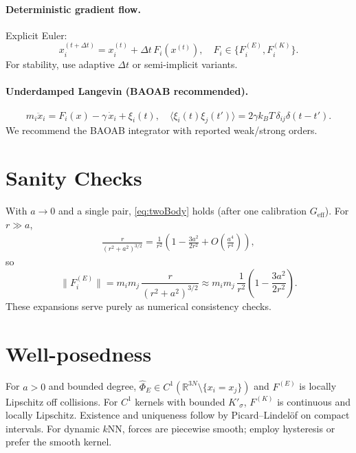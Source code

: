 \documentclass[11pt,a4paper]{article}
\numberwithin{equation}{section}
\newcommand{\R}{\mathbb{R}}
\begin{document}
\paragraph{Deterministic gradient flow.}
Explicit Euler:
\begin{equation}
x_i^{(t+\Delta t)} = x_i^{(t)} + \Delta t\,F_i(x^{(t)}),\quad F_i\in\{F^{(E)}_i,F^{(K)}_i\}.
\end{equation}
For stability, use adaptive $\Delta t$ or semi-implicit variants.

\paragraph{Underdamped Langevin (BAOAB recommended).}
\begin{equation}
m_i\ddot{x}_i = F_i(x)-\gamma\,\dot{x}_i + \xi_i(t),\quad
\langle \xi_i(t)\xi_j(t')\rangle=2\gamma k_B T\,\delta_{ij}\delta(t-t').
\end{equation}
We recommend the BAOAB integrator with reported weak/strong orders.

\section{Sanity Checks}
With $a\to 0$ and a single pair, \eqref{eq:twoBody} holds (after one calibration $G_{\text{eff}}$).  
For $r\gg a$,
\begin{align}
\frac{r}{(r^2+a^2)^{3/2}}
= \frac{1}{r^2}\left(1-\frac{3a^2}{2r^2}+O\!\left(\frac{a^4}{r^4}\right)\right),
\end{align}
so
\begin{equation}
\big\lVert F^{(E)}_i\big\rVert
= m_im_j\,\frac{r}{(r^2+a^2)^{3/2}}
\approx m_im_j\,\frac{1}{r^2}\left(1-\frac{3a^2}{2r^2}\right).
\end{equation}
These expansions serve purely as numerical consistency checks.

\section{Well-posedness}
For $a>0$ and bounded degree, $\widehat{\Phi}_E\in C^1(\R^{3N}\setminus\{x_i=x_j\})$ and $F^{(E)}$ is locally Lipschitz off collisions. For $C^1$ kernels with bounded $K'_\sigma$, $F^{(K)}$ is continuous and locally Lipschitz. Existence and uniqueness follow by Picard–Lindelöf on compact intervals. For dynamic $k$NN, forces are piecewise smooth; employ hysteresis or prefer the smooth kernel.
\end{document}
